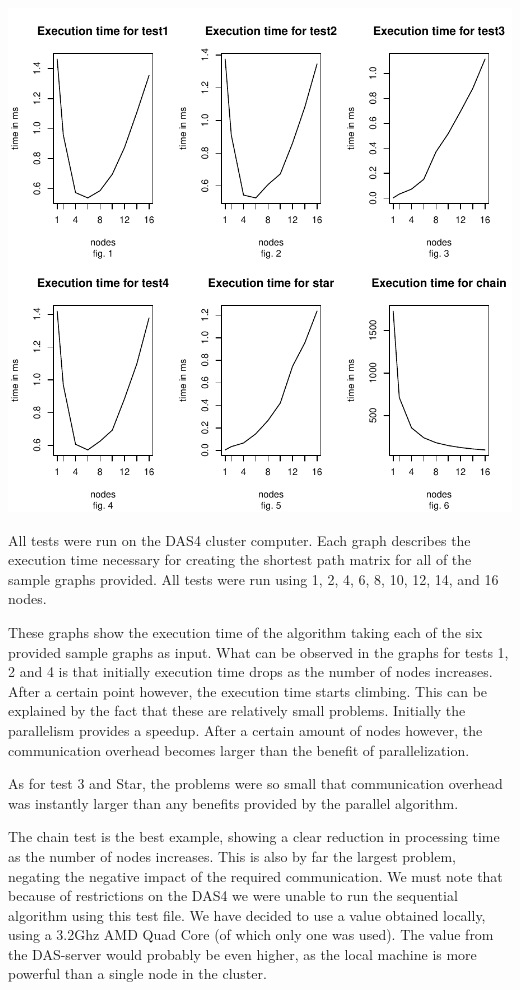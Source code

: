 \documentclass[a4paper,11pt]{article}
\begin{document}
\includegraphics{report-001}

All tests were run on the DAS4 cluster computer. Each graph describes the execution time necessary for creating the shortest path matrix for all of the sample graphs provided. All tests were run using 1, 2, 4, 6, 8, 10, 12, 14, and 16 nodes. 

These graphs show the execution time of the algorithm taking each of the six provided sample graphs as input. What can be observed in the graphs for tests 1, 2 and 4 is that initially execution time drops as the number of nodes increases. After a certain point however, the execution time starts climbing. This can be explained by the fact that these are relatively small problems. Initially the parallelism provides a speedup. After a certain amount of nodes however, the communication overhead becomes larger than the benefit of parallelization. 

As for test 3 and Star, the problems were so small that communication overhead was instantly larger than any benefits provided by the parallel algorithm.

The chain test is the best example, showing a clear reduction in processing time as the number of nodes increases. This is also by far the largest problem, negating the negative impact of the required communication. We must note that because of restrictions on the DAS4 we were unable to run the sequential algorithm using this test file. We have decided to use a value obtained locally, using a 3.2Ghz AMD Quad Core (of which only one was used). The value from the DAS-server would probably be even higher, as the local machine is more powerful than a single node in the cluster. 
\end{document}
